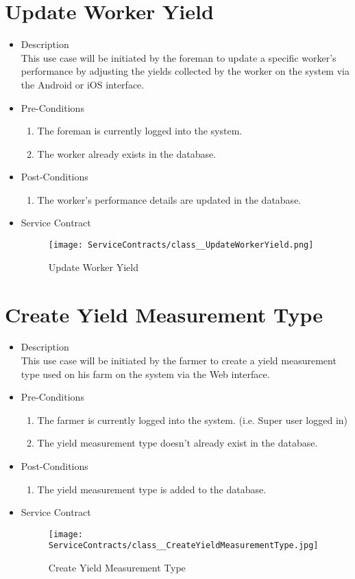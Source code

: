 \documentclass[11pt,fleqn]{book} %
\begin{document}
\section{Update Worker Yield}
\begin{itemize}
	\item Description\\
	This use case will be initiated by the foreman to update a specific worker’s performance by adjusting the yields collected by the worker on the system via the Android or iOS interface.
	\item Pre-Conditions
	\begin{enumerate}
		\item The foreman is currently logged into the system.
		\item The worker already exists in the database.			
	\end{enumerate}
	\item Post-Conditions
	\begin{enumerate}
		\item The worker’s performance details are updated in the database.
	\end{enumerate}
	\item Service Contract
	\begin{figure}
		\texttt{[image: ServiceContracts/class\_\_UpdateWorkerYield.png]}
		\caption{Update Worker Yield}
	\end{figure}
\end{itemize}

\section{Create Yield Measurement Type}
\begin{itemize}
	\item Description\\
	This use case will be initiated by the farmer to create a yield measurement type used on his farm on the system via the Web interface.
	\item Pre-Conditions
	\begin{enumerate}
		\item The farmer is currently logged into the system. (i.e. Super user logged in)
		\item The yield measurement type doesn’t already exist in the database. 				
	\end{enumerate}
	\item Post-Conditions
	\begin{enumerate}
		\item The yield measurement type is added to the database.
	\end{enumerate}
	\item Service Contract
	\begin{figure}
		\texttt{[image: ServiceContracts/class\_\_CreateYieldMeasurementType.jpg]}
		\caption{Create Yield Measurement Type}
	\end{figure}
\end{itemize}
\end{document}
